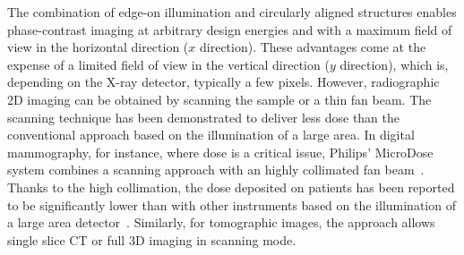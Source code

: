 \documentclass[english]{nature}
\begin{document}
The combination of edge-on illumination and circularly aligned structures
enables phase-contrast imaging at arbitrary design energies and with a
maximum field of view in the horizontal direction ($x$ direction). These
advantages come at the expense of a limited field of view in the vertical
direction ($y$ direction), which is, depending on the X-ray detector,
typically a few pixels. 
However, radiographic 2D imaging can be obtained by scanning the sample or a thin fan
beam. The scanning technique has been demonstrated to deliver less dose than
the conventional approach based on the illumination of a large area. In
digital mammography, for instance, where dose is a critical issue, Philips'
MicroDose system combines a scanning approach with an highly collimated fan
beam~\cite{Aslund2007}. Thanks to the high collimation, the dose deposited
on  patients has been reported to be significantly lower than with other
instruments based on the illumination of a large area
detector~\cite{Oduko2010}.
Similarly, for tomographic images,
the approach allows single slice \ac{CT} or full 3D imaging in scanning mode.
\end{document}
